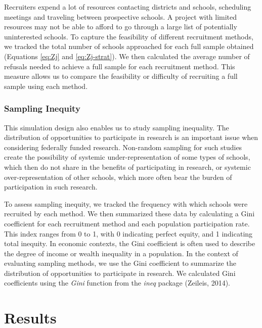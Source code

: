 \documentclass[
  man,floatsintext]{apa6}
\begin{document}
Recruiters expend a lot of resources contacting districts and schools, scheduling meetings and traveling between prospective schools. A project with limited resources may not be able to afford to go through a large list of potentially uninterested schools. To capture the feasibility of different recruitment methods, we tracked the total number of schools approached for each full sample obtained (Equations \eqref{eq:Zj} and \eqref{eq:Zj-strat}). We then calculated the average number of refusals needed to achieve a full sample for each recruitment method. This measure allows us to compare the feasibility or difficulty of recruiting a full sample using each method.

\hypertarget{sampling-inequity}{%
\subsubsection*{Sampling Inequity}\label{sampling-inequity}}

This simulation design also enables us to study sampling inequality. The distribution of opportunities to participate in research is an important issue when considering federally funded research.
Non-random sampling for such studies create the possibility of systemic under-representation of some types of schools, which then do not share in the benefits of participating in research, or systemic over-representation of other schools, which more often bear the burden of participation in such research.

To assess sampling inequity, we tracked the frequency with which schools were recruited by each method. We then summarized these data by calculating a Gini coefficient for each recruitment method and each population participation rate. This index ranges from 0 to 1, with 0 indicating perfect equity, and 1 indicating total inequity.
In economic contexts, the Gini coefficient is often used to describe the degree of income or wealth inequality in a population. In the context of evaluating sampling methods, we use the Gini coefficient to summarize the distribution of opportunities to participate in research. We calculated Gini coefficients using the \emph{Gini} function from the \emph{ineq} package (Zeileis, 2014).

\hypertarget{results}{%
\section*{Results}\label{results}}
\end{document}

